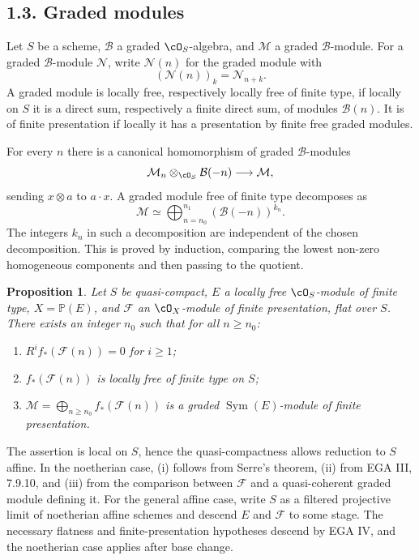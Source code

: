 \documentclass[11pt]{article}
\theoremstyle{plain}
\newtheorem{proposition}[theorem]{Proposition}
\theoremstyle{definition}
\theoremstyle{remark}
\providecommand{\Sym}{\operatorname{Sym}}
\begin{document}
\subsection*{1.3. Graded modules}
Let $S$ be a scheme, $\mathcal B$ a graded $\cO_S$-algebra, and $\mathcal M$ a graded $\mathcal B$-module. For a graded $\mathcal B$-module $\mathcal N$, write $\mathcal N(n)$ for the graded module with
\[
(\mathcal N(n))_k=\mathcal N_{n+k}.
\]
A graded module is locally free, respectively locally free of finite type, if locally on $S$ it is a direct sum, respectively a finite direct sum, of modules $\mathcal B(n)$. It is of finite presentation if locally it has a presentation by finite free graded modules.

For every $n$ there is a canonical homomorphism of graded $\mathcal B$-modules
\begin{equation}\label{eq:VI.1.2.1}
\mathcal M_n\otimes_{\cO_S}\mathcal B(-n)\longrightarrow\mathcal M,
\end{equation}
sending $x\otimes a$ to $a\cdot x$. A graded module free of finite type decomposes as
\begin{equation}\label{eq:VI.1.2.2}
\mathcal M\simeq\bigoplus_{n=n_0}^{n_1}(\mathcal B(-n))^{k_n}.
\end{equation}
The integers $k_n$ in such a decomposition are independent of the chosen decomposition. This is proved by induction, comparing the lowest non-zero homogeneous components and then passing to the quotient.

\begin{proposition}\label{prop:VI.1.3}
Let $S$ be quasi-compact, $E$ a locally free $\cO_S$-module of finite type, $X=\mathbb P(E)$, and $\mathcal F$ an $\cO_X$-module of finite presentation, flat over $S$. There exists an integer $n_0$ such that for all $n\geq n_0$:
\begin{enumerate}[label=(\roman*)]
\item $R^if_*(\mathcal F(n))=0$ for $i\geq 1$;
\item $f_*(\mathcal F(n))$ is locally free of finite type on $S$;
\item $\mathcal M=\bigoplus_{n\geq n_0}f_*(\mathcal F(n))$ is a graded $\Sym(E)$-module of finite presentation.
\end{enumerate}
\end{proposition}

The assertion is local on $S$, hence the quasi-compactness allows reduction to $S$ affine. In the noetherian case, (i) follows from Serre's theorem, (ii) from EGA III, 7.9.10, and (iii) from the comparison between $\mathcal F$ and a quasi-coherent graded module defining it. For the general affine case, write $S$ as a filtered projective limit of noetherian affine schemes and descend $E$ and $\mathcal F$ to some stage. The necessary flatness and finite-presentation hypotheses descend by EGA IV, and the noetherian case applies after base change.
\end{document}
